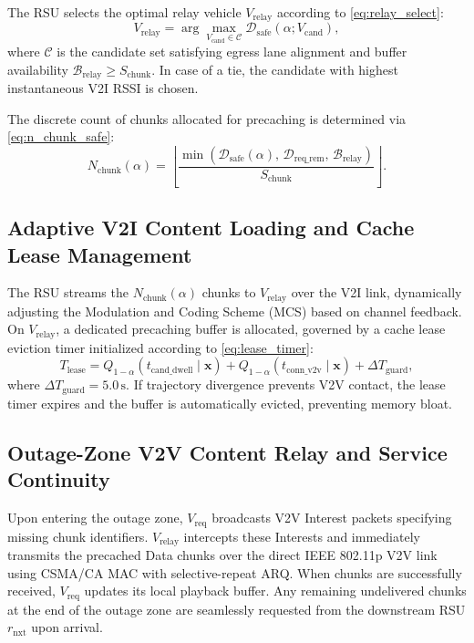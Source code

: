 \documentclass[journal]{IEEEtran}
\begin{document}
The RSU selects the optimal relay vehicle $V_{\text{relay}}$ according to \eqref{eq:relay_select}:
\begin{equation}
V_{\text{relay}} = \arg\max_{V_{\text{cand}} \in \mathcal{C}} \mathcal{D}_{\text{safe}}(\alpha; V_{\text{cand}}),
\label{eq:relay_select}
\end{equation}
where $\mathcal{C}$ is the candidate set satisfying egress lane alignment and buffer availability $\mathcal{B}_{\text{relay}} \ge S_{\text{chunk}}$. In case of a tie, the candidate with highest instantaneous V2I RSSI is chosen.

The discrete count of chunks allocated for precaching is determined via \eqref{eq:n_chunk_safe}:
\begin{equation}
N_{\text{chunk}}(\alpha) = \left\lfloor \frac{\min\left(\mathcal{D}_{\text{safe}}(\alpha), \, \mathcal{D}_{\text{req\_rem}}, \, \mathcal{B}_{\text{relay}}\right)}{S_{\text{chunk}}} \right\rfloor.
\label{eq:n_chunk_safe}
\end{equation}

\subsection{Adaptive V2I Content Loading and Cache Lease Management}
The RSU streams the $N_{\text{chunk}}(\alpha)$ chunks to $V_{\text{relay}}$ over the V2I link, dynamically adjusting the Modulation and Coding Scheme (MCS) based on channel feedback. On $V_{\text{relay}}$, a dedicated precaching buffer is allocated, governed by a cache lease eviction timer initialized according to \eqref{eq:lease_timer}:
\begin{equation}
T_{\text{lease}} = Q_{1-\alpha}(t_{\text{cand\_dwell}} \mid \mathbf{x}) + Q_{1-\alpha}(t_{\text{conn\_v2v}} \mid \mathbf{x}) + \Delta T_{\text{guard}},
\label{eq:lease_timer}
\end{equation}
where $\Delta T_{\text{guard}} = 5.0\,\text{s}$. If trajectory divergence prevents V2V contact, the lease timer expires and the buffer is automatically evicted, preventing memory bloat.

\subsection{Outage-Zone V2V Content Relay and Service Continuity}
Upon entering the outage zone, $V_{\text{req}}$ broadcasts V2V Interest packets specifying missing chunk identifiers. $V_{\text{relay}}$ intercepts these Interests and immediately transmits the precached Data chunks over the direct IEEE 802.11p V2V link using CSMA/CA MAC with selective-repeat ARQ. When chunks are successfully received, $V_{\text{req}}$ updates its local playback buffer. Any remaining undelivered chunks at the end of the outage zone are seamlessly requested from the downstream RSU $r_{\text{nxt}}$ upon arrival.
\end{document}
